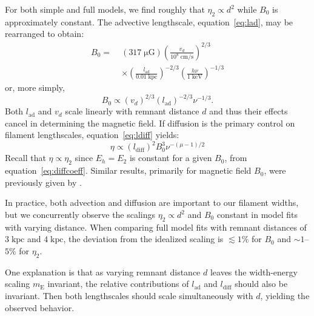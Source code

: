 \documentclass[iop, apj, numberedappendix]{emulateapj}
\newcommand*{\mt}{\mathrm}
\newcommand*{\unit}[1]{\;\mt{#1}}  %
\newcommand*{\abt}{\mathord{\sim}} %
\newcommand*{\mE}{m_\mt{E}}
\newcommand*{\muG}{\unit{\mu G}}
\begin{document}
For both simple and full models, we find roughly that $\eta_2 \propto d^2$
while $B_0$ is approximately constant.  The advective lengthscale,
equation~\eqref{eq:lad}, may be rearranged to obtain:
\begin{align}
    B_0 =\; &(317 \muG) \left(\frac{v_d}{10^8 \unit{cm/s}}\right)^{2/3}
                \nonumber \\
            &\times \left(\frac{l_{\mt{ad}}}{0.01 \unit{kpc}}\right)^{-2/3}
                \left(\frac{h\nu}{1 \unit{keV}}\right)^{-1/3}
\end{align}
or, more simply,
\begin{equation}
    B_0 \propto \left(v_d\right)^{2/3}
                \left(l_{\mt{ad}}\right)^{-2/3} \nu^{-1/3} .
\end{equation}
Both $l_{\mt{ad}}$ and $v_d$ scale linearly with remnant distance $d$ and thus
their effects cancel in determining the magnetic field.  If diffusion is the
primary control on filament lengthscales, equation~\eqref{eq:ldiff} yields:
\begin{equation}
    \eta \propto \left(l_{\mt{diff}}\right)^2 B_0^{3} \nu^{-(\mu - 1)/2}
\end{equation}
Recall that $\eta \propto \eta_2$ since $E_h = E_2$ is constant for a given
$B_0$, from equation~\eqref{eq:diffcoeff}.
Similar results, primarily for magnetic field $B_0$, were previously given by
\citet{parizot2006}.

In practice, both advection and diffusion are important to our filament widths,
but we concurrently observe the scalings $\eta_2 \propto d^2$ and $B_0$
constant in model fits with varying distance.  When comparing full model fits
with remnant distances of $3 \unit{kpc}$ and $4 \unit{kpc}$, the deviation from
the idealized scaling is $\lesssim 1 \%$ for $B_0$ and $\abt 1$--$5\%$ for
$\eta_2$.

One explanation is that as varying remnant distance $d$ leaves the width-energy
scaling $\mE$ invariant, the relative contributions of $l_{\mt{ad}}$ and
$l_{\mt{diff}}$ should also be invariant.  Then both lengthscales should
scale simultaneously with $d$, yielding the observed behavior.


\end{document}
